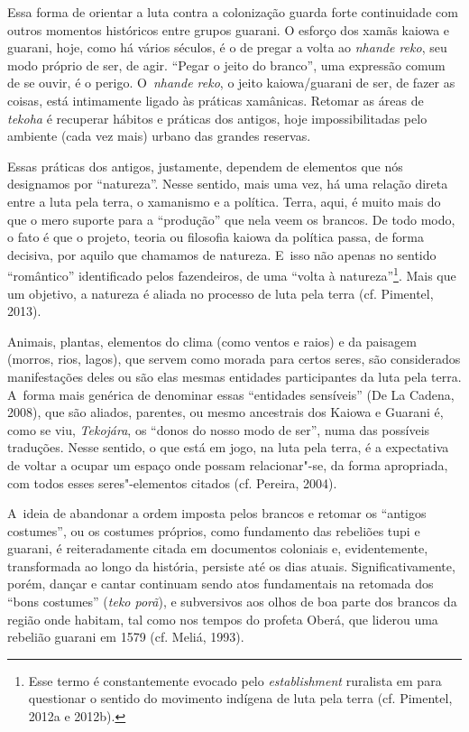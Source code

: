 Essa forma de orientar a luta contra a colonização guarda forte
continuidade com outros momentos históricos entre grupos guarani. O
esforço dos xamãs kaiowa e guarani, hoje, como há vários séculos, é o
de pregar a volta ao \emph{nhande reko}, seu modo próprio de ser, de agir.
``Pegar o jeito do branco'', uma expressão comum de se ouvir, é o perigo.
O~\emph{nhande reko}, o jeito kaiowa/guarani de ser, de fazer as coisas, está
intimamente ligado às práticas xamânicas. Retomar as áreas de \emph{tekoha} é
recuperar hábitos e práticas dos antigos, hoje impossibilitadas pelo
ambiente (cada vez mais) urbano das grandes reservas.

Essas práticas dos antigos, justamente, dependem de elementos que nós
designamos por ``natureza''. Nesse sentido, mais uma vez, há uma relação
direta entre a luta pela terra, o xamanismo e a política. Terra, aqui,
é muito mais do que o mero suporte para a ``produção'' que nela veem os
brancos. De todo modo, o fato é que o projeto, teoria ou filosofia
kaiowa da política passa, de forma decisiva, por aquilo que chamamos de
natureza. E~isso não apenas no sentido ``romântico'' identificado pelos
fazendeiros, de uma ``volta à natureza''\footnote{Esse termo é
constantemente evocado pelo \emph{establishment} ruralista em  para
questionar o sentido do movimento indígena de luta pela terra (cf.
Pimentel, 2012a e 2012b).}. Mais que um objetivo, a natureza é aliada
no processo de luta pela terra (cf. Pimentel, 2013).

Animais, plantas, elementos do clima (como ventos e raios) e da paisagem
(morros, rios, lagos), que servem como morada para certos seres, são
considerados manifestações deles ou são elas mesmas entidades
participantes da luta pela terra. A~forma mais genérica de denominar
essas ``entidades sensíveis'' (De La Cadena, 2008), que são aliados,
parentes, ou mesmo ancestrais dos Kaiowa e Guarani é, como se viu,
\emph{Tekojára}, os ``donos do nosso modo de ser'', numa das possíveis
traduções. Nesse sentido, o que está em jogo, na luta pela terra, é a
expectativa de voltar a ocupar um espaço onde possam relacionar"-se, da
forma apropriada, com todos esses seres"-elementos citados (cf. Pereira,
2004).

A~ideia de abandonar a ordem imposta pelos brancos e retomar os ``antigos
costumes'', ou os costumes próprios, como fundamento das rebeliões tupi
e guarani, é reiteradamente citada em documentos coloniais e,
evidentemente, transformada ao longo da história, persiste até os dias
atuais. Significativamente, porém, dançar e cantar continuam sendo atos
fundamentais na retomada dos ``bons costumes'' (\emph{teko porã}), e subversivos
aos olhos de boa parte dos brancos da região onde habitam, tal como nos
tempos do profeta Oberá, que liderou uma rebelião guarani em 1579 (cf.
Meliá, 1993).

